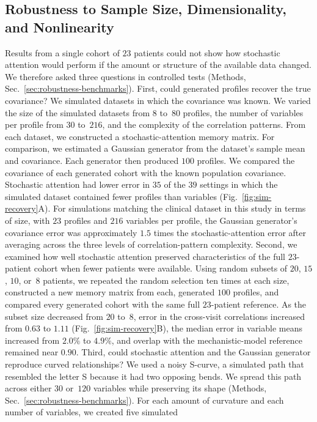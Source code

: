 \subsection{Robustness to Sample Size, Dimensionality, and Nonlinearity}

Results from a single cohort of $23$ patients could not show how stochastic attention
would perform if the amount or structure of the available data changed. We therefore asked three
questions in controlled tests (Methods, Sec.~\ref{sec:robustness-benchmarks}). First,
could generated profiles recover the true covariance? We simulated datasets in which the
covariance was known. We varied the size of the simulated datasets from $8$ to~$80$ profiles,
the number of variables per profile from $30$ to~$216$, and the complexity of the correlation patterns.
From each dataset, we constructed a stochastic-attention memory matrix. For comparison, we
estimated a Gaussian generator from the dataset's sample mean and covariance. Each generator
then produced $100$ profiles. We compared the covariance of each generated cohort
with the known population covariance. Stochastic attention had lower error in $35$ of the $39$ settings in which the
simulated dataset contained fewer profiles than variables (Fig.~\ref{fig:sim-recovery}A). For
simulations matching the clinical dataset in this study in terms of size, with $23$ profiles and $216$ variables per
profile, the Gaussian generator's covariance error was approximately $1.5$ times the stochastic-attention error
after averaging across the three levels of correlation-pattern complexity.
Second, we examined how well stochastic attention preserved characteristics of the full
$23$-patient cohort when fewer patients were available. Using random subsets of $20$, $15$, $10$, or~$8$ patients, we repeated the random selection ten times
at each size, constructed a new memory matrix from each, generated $100$ profiles, and compared every generated cohort with the same full $23$-patient
reference. As the subset size decreased from $20$ to~$8$, error in the cross-visit correlations
increased from $0.63$ to $1.11$ (Fig.~\ref{fig:sim-recovery}B), the median error in variable
means increased from $2.0\%$ to $4.9\%$, and overlap with the mechanistic-model
reference remained near $0.90$. Third, could stochastic attention and the Gaussian generator
reproduce curved relationships? We used a noisy S-curve, a simulated path that resembled the
letter S because it had two opposing bends. We spread this path across either $30$ or~$120$
variables while preserving its shape (Methods, Sec.~\ref{sec:robustness-benchmarks}). For each amount of curvature and each number of variables, we created five simulated
